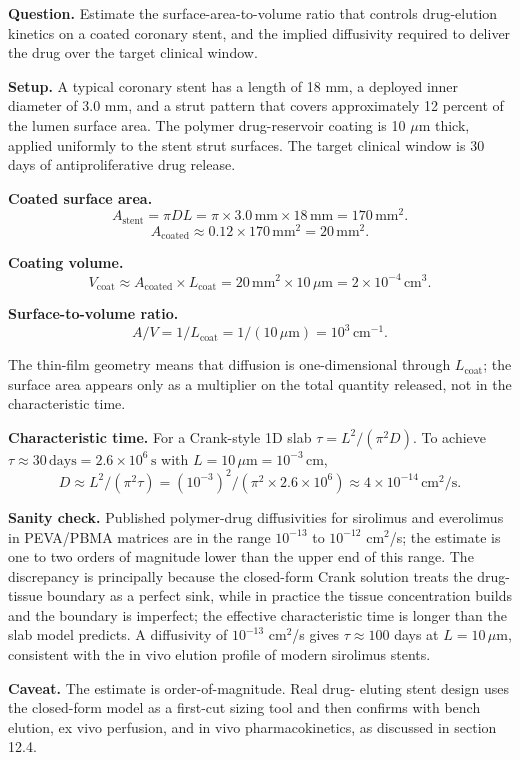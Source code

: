 \begin{estimation}
\textbf{Question.} Estimate the surface-area-to-volume ratio that
controls drug-elution kinetics on a coated coronary stent, and
the implied diffusivity required to deliver the drug over the
target clinical window.

\textbf{Setup.} A typical coronary stent has a length of 18 mm,
a deployed inner diameter of 3.0 mm, and a strut pattern that
covers approximately 12 percent of the lumen surface area. The
polymer drug-reservoir coating is 10 $\mu$m thick, applied uniformly
to the stent strut surfaces. The target clinical window is 30 days
of antiproliferative drug release.

\textbf{Coated surface area.}
\[
A_{\text{stent}} = \pi D L = \pi \times 3.0\,\text{mm}
\times 18\,\text{mm} = 170 \,\text{mm}^2.
\]
\[
A_{\text{coated}} \approx 0.12 \times 170 \,\text{mm}^2
= 20 \,\text{mm}^2.
\]

\textbf{Coating volume.}
\[
V_{\text{coat}} \approx A_{\text{coated}} \times L_{\text{coat}}
= 20 \,\text{mm}^2 \times 10\,\mu\text{m}
= 2 \times 10^{-4}\,\text{cm}^3.
\]

\textbf{Surface-to-volume ratio.}
\[
A/V = 1/L_{\text{coat}} = 1/(10\,\mu\text{m})
= 10^3 \,\text{cm}^{-1}.
\]

The thin-film geometry means that diffusion is one-dimensional
through $L_{\text{coat}}$; the surface area appears only as a
multiplier on the total quantity released, not in the
characteristic time.

\textbf{Characteristic time.} For a Crank-style 1D slab
$\tau = L^2 / (\pi^2 D)$. To achieve $\tau \approx 30 \,\text{days}
= 2.6 \times 10^6 \,\text{s}$ with $L = 10 \,\mu\text{m} = 10^{-3}
\,\text{cm}$,
\[
D \approx L^2 / (\pi^2 \tau)
= (10^{-3})^2 / (\pi^2 \times 2.6 \times 10^6)
\approx 4 \times 10^{-14} \,\text{cm}^2/\text{s}.
\]

\textbf{Sanity check.} Published polymer-drug diffusivities for
sirolimus and everolimus in PEVA/PBMA matrices are in the range
$10^{-13}$ to $10^{-12}$ cm$^2$/s; the estimate is one to two
orders of magnitude lower than the upper end of this range. The
discrepancy is principally because the closed-form Crank solution
treats the drug-tissue boundary as a perfect sink, while in
practice the tissue concentration builds and the boundary is
imperfect; the effective characteristic time is longer than the
slab model predicts. A diffusivity of $10^{-13}$ cm$^2$/s gives
$\tau \approx 100$ days at $L = 10 \,\mu\text{m}$, consistent
with the in vivo elution profile of modern sirolimus stents.

\textbf{Caveat.} The estimate is order-of-magnitude. Real drug-
eluting stent design uses the closed-form model as a first-cut
sizing tool and then confirms with bench elution, ex vivo
perfusion, and in vivo pharmacokinetics, as discussed in section
12.4.
\end{estimation}

